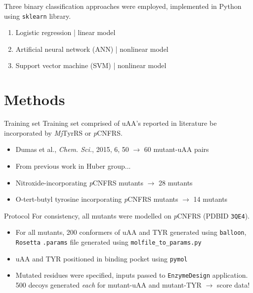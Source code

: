 \documentclass{beamer}
\begin{document}
\begin{frame}
    Three binary classification approaches were employed, implemented in Python using \texttt{sklearn} library.
    \begin{enumerate}
        \item Logistic regression | linear model
    \item Artificial neural network (ANN) | nonlinear model
        \item Support vector machine (SVM) | nonlinear model
    \end{enumerate}
\end{frame}

\section{Methods}
\begin{frame}{Training set}
    Training set comprised of uAA's reported in literature be incorporated by \textit{Mj}TyrRS or \textit{p}CNFRS.
    \begin{itemize}
        \item Dumas et al., \textit{Chem. Sci.}, 2015, 6, 50 $\rightarrow$ 60 mutant-uAA pairs
        \item From previous work in Huber group...
        \item Nitroxide-incorporating \textit{p}CNFRS mutants $\rightarrow$ 28 mutants
        \item O-tert-butyl tyrosine incorporating \textit{p}CNFRS mutants $\rightarrow$ 14 mutants
    \end{itemize}
\end{frame}

\begin{frame}{Protocol}
    For consistency, all mutants were modelled on \textit{p}CNFRS (PDBID \texttt{3QE4}).
    \begin{itemize}
        \item For all mutants, 200 conformers of uAA and TYR generated using \texttt{balloon}, \texttt{Rosetta} \texttt{.params} file generated using \texttt{molfile\_to\_params.py}
        \item uAA and TYR positioned in binding pocket using \texttt{pymol}
        \item Mutated residues were specified, inputs passed to \texttt{EnzymeDesign} application. 500 decoys generated \textit{each} for mutant-uAA and mutant-TYR $\rightarrow$ score data!
\end{itemize}
\end{frame}
\end{document}
